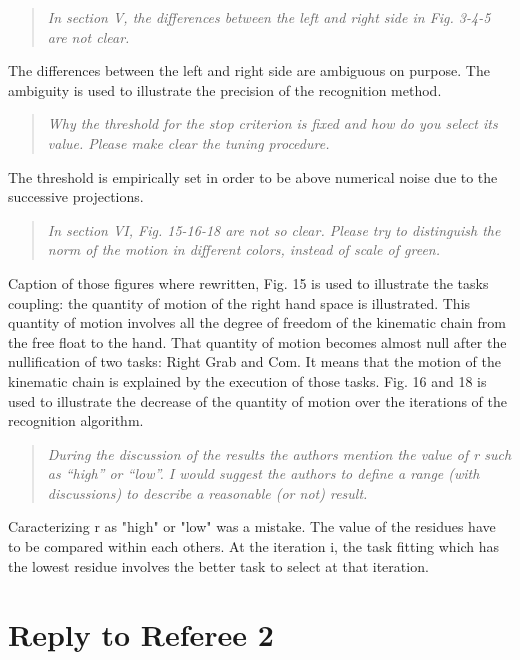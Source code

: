 \documentclass[11pt]{article}
\begin{document}
\begin{quote}
\textit{
 In section V, the differences between the left and right side in Fig. 3-4-5 are not clear.
}
\end{quote}
The differences between the left and right side are ambiguous on purpose.
The ambiguity is used to illustrate the precision of the recognition method.
 
\begin{quote}
\textit{
 Why the threshold for the stop criterion is fixed and how do you select its value.  Please make clear the tuning procedure.
}
\end{quote}
The threshold is empirically set in order to be above numerical noise
due to the successive projections. 

\begin{quote}
\textit{
In section VI, Fig. 15-16-18 are not so clear. Please try to distinguish the norm of the motion in different colors, instead of scale of green.
}
\end{quote}
Caption of those figures where rewritten, Fig. 15 is used to illustrate
the tasks coupling: the quantity of motion of the right hand space is illustrated.
This quantity of motion involves all the degree of freedom of the kinematic chain from
the free float to the hand. That quantity of motion becomes almost null after
the nullification of two tasks: Right Grab and Com.
It means that the motion of the kinematic chain is explained by the execution of those tasks.
Fig. 16 and 18 is used to illustrate the decrease of the quantity of motion over the iterations of the recognition
algorithm.

\begin{quote}
\textit{
 During the discussion of the results the authors mention the value of r such as “high” or “low”. I would suggest the authors to define a range (with discussions) to describe a reasonable (or not) result.
}
\end{quote}
Caracterizing r as "high" or "low" was a mistake. The value of the residues have
to be compared within each others. At the iteration i, the task fitting which has the lowest 
residue involves the better task to select at that iteration.

\section{Reply to Referee 2}
\end{document}
